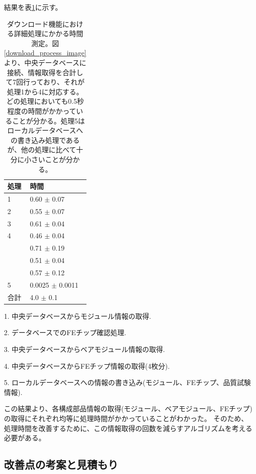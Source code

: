 結果を表\ref{download_process_details}に示す。
\begin{table}[tbp]
\begin{center}
\caption[ダウンロード機能における詳細処理にかかる時間測定]{ダウンロード機能における詳細処理にかかる時間測定。図\ref{download_process_image}より、中央データベースに接続、情報取得を合計して7回行っており、それが処理1から4に対応する。どの処理においても0.5秒程度の時間がかかっていることが分かる。処理5はローカルデータベースへの書き込み処理であるが、他の処理に比べて十分に小さいことが分かる。}
\label{download_process_details}
  \begin{tabular}{|ll|} \hline
    処理 & 時間 \\ \hline
    1 &  0.60 $\pm$ 0.07 \\ 
    2 &  0.55 $\pm$ 0.07 \\ 
    3 &  0.61 $\pm$ 0.04 \\ 
    4 &  0.46 $\pm$ 0.04 \\ 
      &  0.71 $\pm$ 0.19 \\ 
      &  0.51 $\pm$ 0.04 \\ 
      &  0.57 $\pm$ 0.12 \\ 
    5 &  0.0025 $\pm$ 0.0011 \\ 
    合計 & 4.0 $\pm$ 0.1 \\ \hline
  \end{tabular}
  \begin{tablenotes}
    \item[1] 1. 中央データベースからモジュール情報の取得.
    \item[2] 2. データベースでのFEチップ確認処理.
    \item[3] 3. 中央データベースからベアモジュール情報の取得.
    \item[4] 4. 中央データベースからFEチップ情報の取得(4枚分).
    \item[5] 5. ローカルデータベースへの情報の書き込み(モジュール、FEチップ、品質試験情報).
  \end{tablenotes}
\end{center}
\end{table}

この結果より、各構成部品情報の取得(モジュール、ベアモジュール、FEチップ)の取得にそれぞれ均等に処理時間がかかっていることがわかった。
そのため、処理時間を改善するために、この情報取得の回数を減らすアルゴリズムを考える必要がある。

\subsection{改善点の考案と見積もり}


